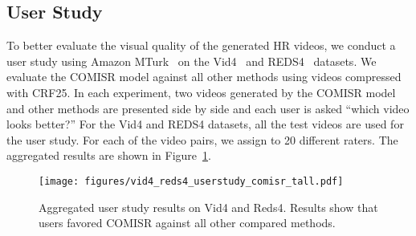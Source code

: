 \begin{table}[tp]
\vspace{1mm}
\caption{Ablations on three modules of the COMISR model on Vid4: (a) bi-directional recurrent module, (b) detail-aware flow estimation, and (c) Laplacian enhancement module.
Each entry shows the PSNR/SSIM values on the Y-channel.
}
\label{tbl:model_ablation}
\vspace{-0.1cm}
\end{table}

\subsection{User Study}
\label{userstudy}
To better evaluate the visual quality of the generated HR videos, we conduct a user study using Amazon MTurk~\cite{mturk} on the Vid4~\cite{vid4} and REDS4~\cite{Nah_2019_CVPR_Workshops_REDS} datasets.
We evaluate the COMISR model against all other methods using videos compressed with CRF25.
In each experiment, two videos generated by the COMISR model and other methods are presented side by side and 
each user is asked ``which video looks better?''
For the Vid4 and REDS4 datasets, all the test videos are used for the user study.
For each of the video pairs, we assign to 20 different raters.
The aggregated results are shown in Figure~\ref{fig:userstudy}.
\begin{figure}[!htb]
\centering
\texttt{[image: figures/vid4\_reds4\_userstudy\_comisr\_tall.pdf]}
\caption{Aggregated user study results on Vid4 and Reds4.
Results show that users favored COMISR against all other compared methods.
}
\vspace{-0.2cm}
\label{fig:userstudy}
\end{figure}